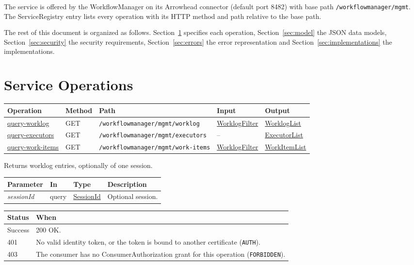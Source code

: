 \documentclass[a4paper]{arrowhead}
\newcommand{\fparam}[1]{\textit{\textcolor{ArrowheadBlue}{#1}}}
\newcommand{\mref}[1]{{\textcolor{ArrowheadPurple}{\hyperref[sec:model:#1]{#1}}}}
\newcommand{\oref}[1]{{\textcolor{ArrowheadBlue}{\hyperref[sec:operations:#1]{#1}}}}
\newcommand{\pref}[1]{{\textcolor{ArrowheadGrey}{\hyperref[sec:model:primitives:#1]{#1}}}}
\begin{document}
The service is offered by the WorkflowManager on its Arrowhead connector (default port 8482) with base path \texttt{/\allowbreak{}workflowmanager/\allowbreak{}mgmt}.
The ServiceRegistry entry lists every operation with its HTTP method and path relative to the base path.

The rest of this document is organized as follows. Section~\ref{sec:operations} specifies each operation,
Section~\ref{sec:model} the JSON data models, Section~\ref{sec:security} the security requirements,
Section~\ref{sec:errors} the error representation and Section~\ref{sec:implementations} the implementations.

\newpage
\section{Service Operations}
\label{sec:operations}

{\small
\begin{longtable}{|p{3.0cm}|p{1.5cm}|p{5.3cm}|p{3.0cm}|p{3.0cm}|}

\hline
\rowcolor{gray!33} Operation & Method & Path & Input & Output \\ \hline
\endhead
\oref{query-worklog} & GET & \texttt{/\allowbreak{}workflowmanager/\allowbreak{}mgmt/\allowbreak{}worklog} & \mref{WorklogFilter} & \mref{WorklogList} \\ \hline
\oref{query-executors} & GET & \texttt{/\allowbreak{}workflowmanager/\allowbreak{}mgmt/\allowbreak{}executors} & -- & \mref{ExecutorList} \\ \hline
\oref{query-work-items} & GET & \texttt{/\allowbreak{}workflowmanager/\allowbreak{}mgmt/\allowbreak{}work-\allowbreak{}items} & \mref{WorklogFilter} & \mref{WorkItemList} \\ \hline
\end{longtable}
}

Returns worklog entries, optionally of one session.

{\small
\begin{longtable}{|p{3.0cm}|p{1.4cm}|p{3.2cm}|p{8.2cm}|}

\hline
\rowcolor{gray!33} Parameter & In & Type & Description \\ \hline
\endhead
\fparam{sessionId} & query & \pref{SessionId} & Optional session. \\ \hline
\end{longtable}
}


{\small
\begin{longtable}{|p{2.0cm}|p{13.8cm}|}

\hline
\rowcolor{gray!33} Status & When \\ \hline
\endhead
Success & 200 OK. \\ \hline
401 & No valid identity token, or the token is bound to another certificate (\texttt{AUTH}). \\ \hline
403 & The consumer has no ConsumerAuthorization grant for this operation (\texttt{FORBIDDEN}). \\ \hline
\end{longtable}
}
\end{document}
